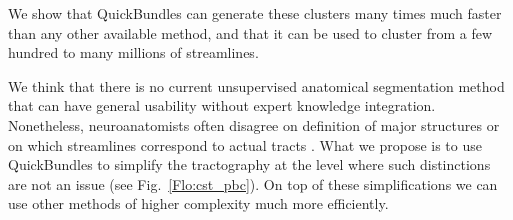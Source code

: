\documentclass{bioinfo}
\begin{document}
We show that QuickBundles can generate these clusters many times much
faster than any other available method, and that it can be used to
cluster from a few hundred to many millions of streamlines.

We think that there is no current unsupervised anatomical segmentation
method that can have general usability without expert knowledge
integration. Nonetheless, neuroanatomists often disagree on definition
of major structures or on which streamlines correspond to actual tracts
\citep{schmahmann2009fiber, makris2005segmentation,
  frey2008dissociating,catani2005perisylvian, moriBook,
  fernandez2012high, verstynen2011vivo}.  What we propose is to use
QuickBundles to simplify the tractography at the level where such
distinctions are not an issue (see Fig.~\ref{Flo:cst_pbc}). On top of
these simplifications we can use other methods of higher complexity much
more efficiently.
\end{document}
